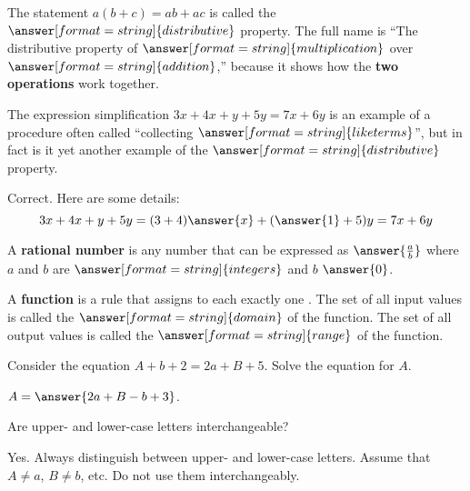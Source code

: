 \documentclass[nooutcomes]{ximera}
\begin{document}
\begin{problem}
The statement $a(b+c)=ab+ac$ is called the $\answer[format=string]{distributive}$ property.  The full name is ``The distributive property of $\answer[format=string]{multiplication}$ over $\answer[format=string]{addition}$,'' because it shows how the \textbf{two operations} work together. 
\end{problem}

\begin{problem}
The expression simplification $3x+4x+y+5y=7x+6y$ is an example of a procedure often called ``collecting 
$\answer[format=string]{like terms}$'', but in fact is it yet another example of the 
$\answer[format=string]{distributive}$ property. 
\begin{problem}
Correct.  Here are some details: 
\[
3x+4x+y+5y=(3+4)\answer{x}+(\answer{1}+5)y=7x+6y
\]
\end{problem}
\end{problem}

\begin{problem}
A \textbf{rational number} is any number that can be expressed as $\answer{\frac{a}{b}}$ where $a$ and $b$ are $\answer[format=string]{integers}$ and $b$ \wordChoice{\choice{$=$} \choice{$<$} \choice{$>$} \choice[correct]{$\ne$}} $\answer{0}$.
\end{problem}

\begin{problem}
A \textbf{function} is a rule that assigns to each 
 exactly one .  The set of 
all input values is called the $\answer[format=string]{domain}$ of the function.  The set of 
all output values is called the $\answer[format=string]{range}$ of the function.
\end{problem}

\begin{problem}
Consider the equation $A+b+2=2a+B+5$.  Solve the equation for $A$.  

$A=\answer{2a+B-b+3}$.  
\begin{hint}
Are upper- and lower-case letters interchangeable?  
\end{hint}
\begin{feedback}[correct]
Yes.  Always distinguish between upper- and lower-case letters.  Assume that $A\ne a$, $B\ne b$, etc.  Do not use them interchangeably.  
\end{feedback}
\end{problem}
\end{document}
